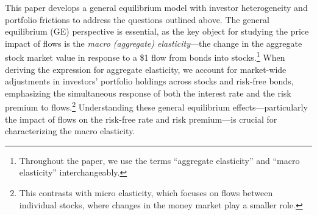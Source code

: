This paper develops a general equilibrium model with investor heterogeneity and portfolio frictions to address the questions outlined above. The general equilibrium (GE) perspective is essential, as the key object for studying the price impact of flows is the \textit{macro (aggregate) elasticity}---the change in the aggregate stock market value in response to a \$1 flow from bonds into stocks.\footnote{Throughout the paper, we use the terms ``aggregate elasticity'' and ``macro elasticity'' interchangeably.}
When deriving the expression for aggregate elasticity, we account for market-wide adjustments in investors’ portfolio holdings across stocks and risk-free bonds, emphasizing the simultaneous response of both the interest rate and the risk premium to flows.\footnote{This contrasts with micro elasticity, which focuses on flows between individual stocks, where changes in the money market play a smaller role.} Understanding these general equilibrium effects---particularly the impact of flows on the risk-free rate and risk premium---is crucial for characterizing the macro elasticity.

